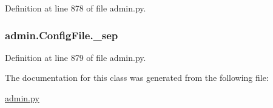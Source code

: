Definition at line 878 of file admin.\-py.

\hypertarget{classadmin_1_1ConfigFile_a3f7db562c59049e6a3b28b1fdfafa63e}{
\subsubsection[{\-\_\-sep}]{\setlength{\rightskip}{0pt plus 5cm}admin.\-Config\-File.\-\_\-sep\hspace{0.3cm}{\ttfamily [private]}}}\label{classadmin_1_1ConfigFile_a3f7db562c59049e6a3b28b1fdfafa63e}


Definition at line 879 of file admin.\-py.



The documentation for this class was generated from the following file\-:\begin{DoxyCompactItemize}
\item 
\hyperlink{admin_8py}{admin.\-py}\end{DoxyCompactItemize}
